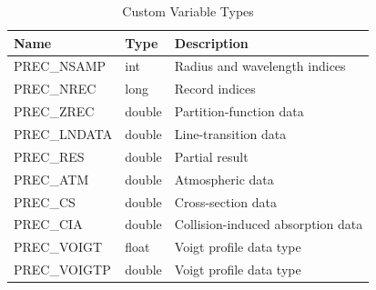 \documentclass[letterpaper,12pt]{article}
\begin{document}
\begin{table}[ht]
\centering
\caption{Custom Variable Types}
\label{table:types}
\begin{tabular}{lll}
\hline
\hline
Name         & Type   & Description \\
\hline
PREC\_NSAMP  & int    &  Radius and wavelength indices \\
PREC\_NREC   & long   &  Record indices \\
PREC\_ZREC   & double &  Partition-function data \\
PREC\_LNDATA & double &  Line-transition data  \\
PREC\_RES    & double &  Partial result  \\
PREC\_ATM    & double &  Atmospheric data  \\
PREC\_CS     & double &  Cross-section data  \\
PREC\_CIA    & double &  Collision-induced absorption data  \\
PREC\_VOIGT  & float  & Voigt profile data type \\
PREC\_VOIGTP & double & Voigt profile data type \\
\hline
\end{tabular}
\end{table}

\newpage
\end{document}
